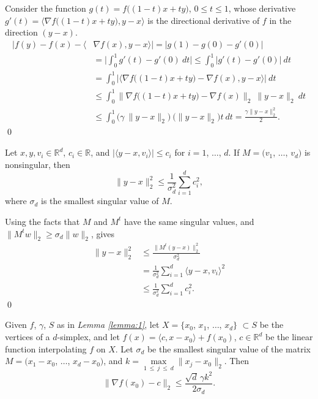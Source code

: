 \documentclass[smallextended,final]{svjour3}  %
\begin{document}
\begin{proofdot}
  Consider the function $g(t) = f \big((1-t) x + t y \big)$, $0 \leq t
  \leq 1$, whose derivative $g'(t) = \big\langle \nabla f \big((1-t) x
  + t y \big), y - x \big\rangle$ is the directional derivative of $f$
  in the direction $(y - x).$
  \begin{align*}
    \big|f(y) - f(x) - \langle &\nabla f(x), y - x \rangle \big|
        = \big|g(1) - g(0) - g'(0) \big| \\
       &= \bigg| \int_0^1 g'(t) - g'(0)\ dt \bigg| \leq \int_0^1 \big|g'(t) - g'(0)\big|\ dt \\
       &= \int_0^1 \bigg| \big \langle \nabla f\big((1-t)x + ty\big) - \nabla f(x), y - x \big \rangle \bigg|\ dt \\
       &\leq \int_0^1 \big \| \nabla f\big((1-t)x + ty\big) - \nabla f(x) \big \|_2\ \| y - x \|_2\ dt \\
       &\leq \int_0^1 \big ( \gamma\ \|y-x\|_2 \big) \ \big( \|y-x\|_2 \big) t\ dt = \frac{\gamma \|y - x\|_2^2}{2}.
  \end{align*}
  \qed
\end{proofdot}

\hfill

\begin{plainlemma}
  \label{lemma:2}
  Let $x, y, v_i \in \mathbb{R}^d$, $c_i \in \mathbb{R}$, and
  $|\langle y - x, v_i \rangle| \leq c_i$ for $i = 1$, $\ldots$, $d.$
  If $M = (v_1$, $\ldots$, $v_d)$ is nonsingular, then
  $$\|y - x\|_2^2 \leq \frac{1}{\sigma_d^2} \sum_{i=1}^d c_i^2,$$
  where $\sigma_d$ is the smallest singular value of $M.$
\end{plainlemma}

\begin{proofdot}
  Using the facts that $M$ and $M^t$ have the same singular values,
  and $\|M^tw\|_2 \geq \sigma_d \|w\|_2$, gives
  \begin{align*}
    \|y - x\|_2^2 &\leq \frac{\|M^t (y - x)\|_2^2}{\sigma_d^2} \\
                  &=    \frac{1}{\sigma_d^2} \sum_{i=1}^d \langle y - x, v_i \rangle^2 \\
                  &\leq \frac{1}{\sigma_d^2} \sum_{i=1}^d c_i^2.
  \end{align*}
  \qed
\end{proofdot}

\newpage

\begin{plainlemma}
  \label{lemma:3}
  Given $f$, $\gamma$, $S$ as in {\it Lemma \ref{lemma:1}}, let $X =
  \{x_0$, $x_1$, $\ldots$, $x_d\}$ $\subset S$ be the vertices of a
  $d$-simplex, and let $\hat f(x) = \langle c, x - x_0 \rangle +
  f(x_0)$, $c \in \mathbb{R}^d$ be the linear function interpolating
  $f$ on $X.$ Let $\sigma_d$ be the smallest singular value of the
  matrix $M = (x_1 - x_0$, $\ldots$, $x_d - x_0)$, and $k =
  \max\limits_{1\ \leq\ j\ \leq\ d} \|x_j - x_0\|_2.$ Then
  $$\big\|\nabla f(x_0) - c\big\|_2 \leq \frac{\sqrt{d} \, \gamma k^2}{2 \sigma_d}.$$
\end{plainlemma}
\end{document}
